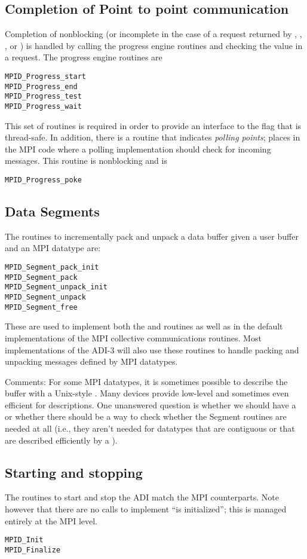 \subsection{Completion of Point to point communication}
Completion of nonblocking (or incomplete in the case of a request
returned by , , , or
) is handled by calling the progress engine routines
and checking the  value in a request.  The progress engine
routines are
\begin{verbatim}
MPID_Progress_start
MPID_Progress_end
MPID_Progress_test
MPID_Progress_wait
\end{verbatim}
This set of routines is required in order to provide an
interface to the  flag that is thread-safe.
In addition, there is a routine that indicates \emph{polling points};
places in the MPI code where a polling implementation should check for
incoming messages.  This routine is nonblocking and is 
\begin{verbatim}
MPID_Progress_poke
\end{verbatim}

\subsection{Data Segments}
The routines to incrementally pack and unpack a data buffer given a
user buffer and an MPI datatype are:
\begin{verbatim}
MPID_Segment_pack_init
MPID_Segment_pack
MPID_Segment_unpack_init
MPID_Segment_unpack
MPID_Segment_free
\end{verbatim}
These are used to implement both the  and
 routines as well as in the default implementations
of the MPI collective communications routines.  Most implementations
of the ADI-3 will also use these routines to handle packing and
unpacking messages defined by MPI datatypes.

Comments:  For some MPI datatypes, it is sometimes possible to
describe the buffer with a Unix-style .  Many
devices provide low-level and sometimes even efficient for
 descriptions.  One unanswered question is whether we
should have a  or whether there should
be a way to check whether the Segment routines are needed at all
(i.e., they aren't needed for datatypes that are contiguous or that
are described efficiently by a ).  

\subsection{Starting and stopping}
The routines to start and stop the ADI match the MPI counterparts.
Note however that there are no calls to implement ``is initialized'';
this is managed entirely at the MPI level.
\begin{verbatim}
MPID_Init
MPID_Finalize
\end{verbatim}

